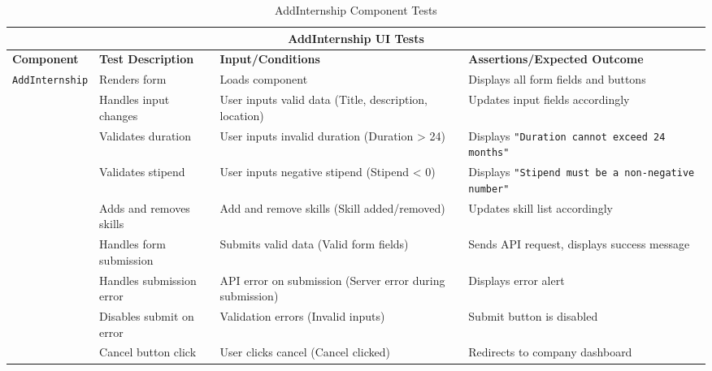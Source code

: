 \begin{table}[ht]
\centering
\begin{tabular}{|p{3cm}|p{4cm}|p{4cm}|p{5cm}|}
\hline
\multicolumn{4}{|c|}{\textbf{AddInternship UI Tests}} \\
\hline
\textbf{Component} & \textbf{Test Description} & \textbf{Input/Conditions} & \textbf{Assertions/Expected Outcome} \\
\hline
\multirow{9}{*}{\texttt{AddInternship}}
 & Renders form               & Loads component                     & Displays all form fields and buttons \\ \cline{2-4}
 & Handles input changes      & User inputs valid data \newline (Title, description, location)  
                              & Updates input fields accordingly \\ \cline{2-4}
 & Validates duration         & User inputs invalid duration \newline (Duration > 24) 
                              & Displays \texttt{"Duration cannot exceed 24 months"} \\ \cline{2-4}
 & Validates stipend          & User inputs negative stipend \newline (Stipend < 0)
                              & Displays \texttt{"Stipend must be a non-negative number"} \\ \cline{2-4}
 & Adds and removes skills    & Add and remove skills \newline (Skill added/removed)
                              & Updates skill list accordingly \\ \cline{2-4}
 & Handles form submission    & Submits valid data \newline (Valid form fields)
                              & Sends API request, displays success message \\ \cline{2-4}
 & Handles submission error   & API error on submission \newline (Server error during submission)
                              & Displays error alert \\ \cline{2-4}
 & Disables submit on error   & Validation errors \newline (Invalid inputs)
                              & Submit button is disabled \\ \cline{2-4}
 & Cancel button click        & User clicks cancel \newline (Cancel clicked)
                              & Redirects to company dashboard \\
\hline
\end{tabular}
\caption{AddInternship Component Tests}
\label{tab:add_internship_tests}
\end{table}

